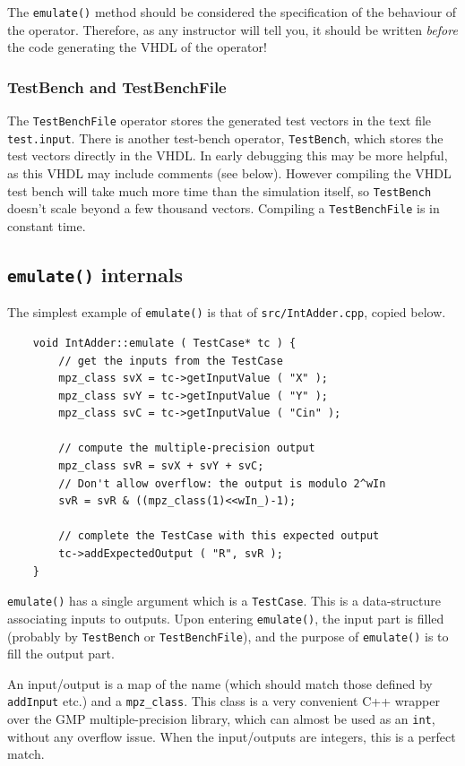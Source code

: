 \documentclass{article}
\begin{document}
The \texttt{\small emulate()} method should be considered  the specification of
the behaviour of the operator. Therefore, as any instructor will tell
you, it should be written \emph{before} the code generating the VHDL
of the operator!

\subsubsection{TestBench and TestBenchFile}
The \texttt{\small TestBenchFile} operator stores the generated test vectors in the text file \texttt{\small test.input}.
There is another test-bench operator, \texttt{\small TestBench}, which stores the test vectors directly in the VHDL. In early debugging this may be more helpful, as this VHDL may include comments (see below). However compiling the VHDL test bench will take much more time than the simulation itself, so \texttt{\small TestBench} doesn't scale beyond a few thousand vectors. Compiling a \texttt{\small TestBenchFile} is in constant time.




\subsection{\texttt{emulate()}  internals}
The simplest example of \texttt{\small emulate()} is that of \texttt{\small src/IntAdder.cpp}, copied below.
\begin{verbatim}
	void IntAdder::emulate ( TestCase* tc ) {
		// get the inputs from the TestCase
		mpz_class svX = tc->getInputValue ( "X" );
		mpz_class svY = tc->getInputValue ( "Y" );
		mpz_class svC = tc->getInputValue ( "Cin" );
		
		// compute the multiple-precision output
		mpz_class svR = svX + svY + svC;
		// Don't allow overflow: the output is modulo 2^wIn
		svR = svR & ((mpz_class(1)<<wIn_)-1);
		
		// complete the TestCase with this expected output
		tc->addExpectedOutput ( "R", svR );
	}
\end{verbatim}

\texttt{\small emulate()} has a single argument which is a
\texttt{\small TestCase}. This is a data-structure associating inputs to
outputs. Upon entering \texttt{\small emulate()}, the input part is filled
(probably by \texttt{\small TestBench} or \texttt{\small TestBenchFile}), and the
purpose of \texttt{\small emulate()} is to fill the output part.

An input/output is a map of the name (which should match those defined by \texttt{\small addInput} etc.) and a \texttt{\small mpz\_class}. This class is a very convenient C++ wrapper over the GMP multiple-precision library, which can almost be used as an \texttt{\small int}, without any overflow issue. When the input/outputs are integers, this is a perfect match.
\end{document}

